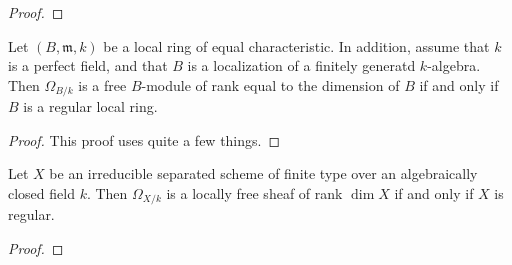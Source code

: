 \begin{proof}
\end{proof}

\begin{theorem}
	[Hartshorne II.8.8]
	\label{thm:reg_loc_iff_free_kahler_diff_mod}
	Let \((B,\mathfrak{m},k)\) be a local ring of
	equal characteristic.
	In addition, assume that
	\(k\) is a perfect field,
	and that \(B\) is a localization of
	a finitely generatd \(k\)-algebra.
	Then \(\Omega_{B / k}\) is a free \(B\)-module
	of rank equal to the dimension of \(B\) 
	if and only if \(B\) is a regular local ring.

\end{theorem}

\begin{proof}
  This proof uses quite a few things.
\end{proof}


\begin{theorem}
  [Hartshorne II.8.15]
  \label{thm:regular_implies_kahler_diff_free}
  Let \(X\) be an irreducible separated scheme of finite type 
  over an algebraically closed field \(k\).
  Then \(\Omega_{X / k}\) is a locally free
  sheaf of rank \(\dim X\) if and only if 
  \(X\) is regular.
\end{theorem}

\begin{proof}


\end{proof}




